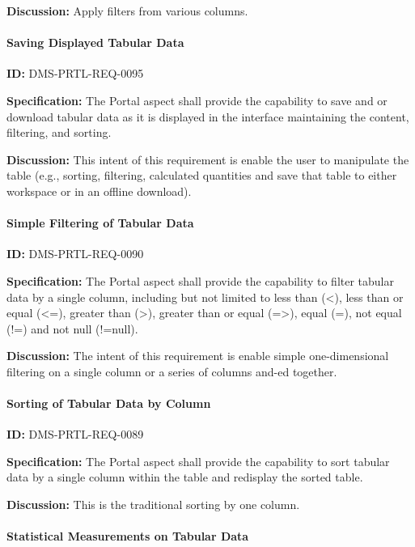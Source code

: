 \documentclass[SE,toc,lsstdraft]{lsstdoc}
\begin{document}
\textbf{Discussion:}
Apply filters from various columns.

\paragraph{Saving Displayed Tabular Data}\hfill  %

\label{DMS-PRTL-REQ-0095}
\textbf{ID:} DMS-PRTL-REQ-0095

\textbf{Specification:}
The Portal aspect shall provide the capability to save and or download tabular data as it is displayed in the interface maintaining the content, filtering, and sorting.

\textbf{Discussion:}
This intent of this requirement is enable the user to manipulate the table (e.g., sorting, filtering, calculated quantities and save that table to either workspace or in an offline download).

\paragraph{Simple Filtering of Tabular Data}\hfill  %

\label{DMS-PRTL-REQ-0090}
\textbf{ID:} DMS-PRTL-REQ-0090

\textbf{Specification:}
The Portal aspect shall provide the capability to filter tabular data by a single column, including but not limited to less than (<), less than or equal (<=), greater than (>), greater than or equal (=>), equal (=), not equal (!=) and not null (!=null).

\textbf{Discussion:}
The intent of this requirement is enable simple one-dimensional filtering on a single column or a series of columns and-ed together.

\paragraph{Sorting of Tabular Data by Column}\hfill  %

\label{DMS-PRTL-REQ-0089}
\textbf{ID:} DMS-PRTL-REQ-0089

\textbf{Specification:}
The Portal aspect shall provide the capability to sort tabular data by a single column within the table and redisplay the sorted table.

\textbf{Discussion:}
This is the traditional sorting by one column.

\paragraph{Statistical Measurements on Tabular Data}\hfill  %
\end{document}
